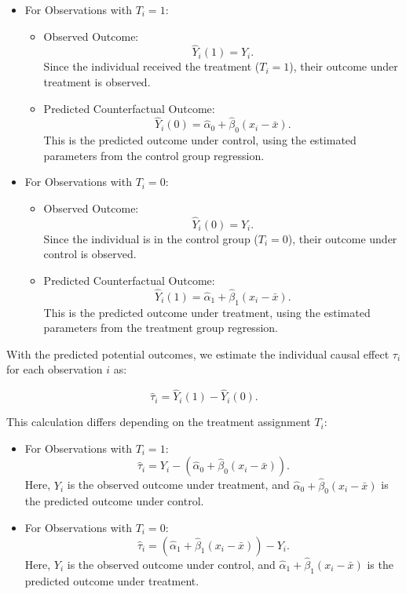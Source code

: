 \documentclass{article}
\begin{document}
\begin{itemize}
    \item For Observations with \(T_i = 1\):
        \begin{itemize}
            \item Observed Outcome:
            \[
            \hat{Y}_i(1) = Y_i.
            \]
            Since the individual received the treatment (\(T_i = 1\)), their outcome under treatment is observed.
            \item Predicted Counterfactual Outcome:
            \[
            \hat{Y}_i(0) = \hat{\alpha}_0 + \hat{\beta}_0 (x_i - \bar{x}).
            \]
            This is the predicted outcome under control, using the estimated parameters from the control group regression.
        \end{itemize}
    \item For Observations with \(T_i = 0\):
        \begin{itemize}
            \item Observed Outcome:
            \[
            \hat{Y}_i(0) = Y_i.
            \]
            Since the individual is in the control group (\(T_i = 0\)), their outcome under control is observed.
            \item Predicted Counterfactual Outcome:
            \[
            \hat{Y}_i(1) = \hat{\alpha}_1 + \hat{\beta}_1 (x_i - \bar{x}).
            \]
            This is the predicted outcome under treatment, using the estimated parameters from the treatment group regression.
        \end{itemize}
\end{itemize}

With the predicted potential outcomes, we estimate the individual causal effect \(\tau_i\) for each observation \(i\) as:

\[
\hat{\tau}_i = \hat{Y}_i(1) - \hat{Y}_i(0).
\]

This calculation differs depending on the treatment assignment \(T_i\):

\begin{itemize}
    \item For Observations with \(T_i = 1\):
    \[
    \hat{\tau}_i = Y_i - \left( \hat{\alpha}_0 + \hat{\beta}_0 (x_i - \bar{x}) \right).
    \]
    Here, \(Y_i\) is the observed outcome under treatment, and \(\hat{\alpha}_0 + \hat{\beta}_0 (x_i - \bar{x})\) is the predicted outcome under control.
    
    \item For Observations with \(T_i = 0\):
    \[
    \hat{\tau}_i = \left( \hat{\alpha}_1 + \hat{\beta}_1 (x_i - \bar{x}) \right) - Y_i.
    \]
    Here, \(Y_i\) is the observed outcome under control, and \(\hat{\alpha}_1 + \hat{\beta}_1 (x_i - \bar{x})\) is the predicted outcome under treatment.
\end{itemize}
\end{document}

